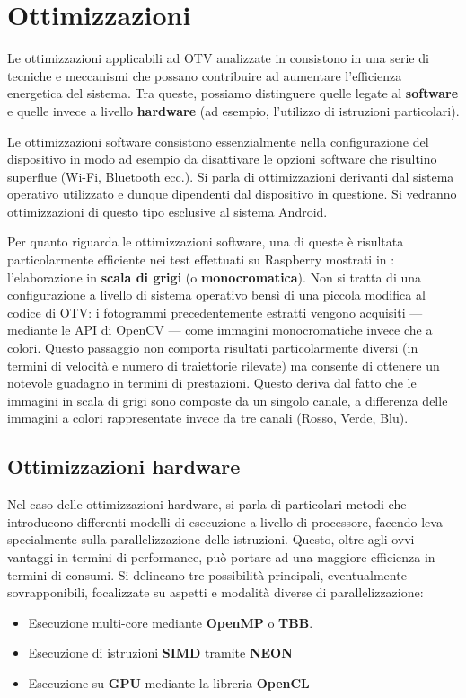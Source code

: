 \section{Ottimizzazioni}
\label{sec:ottim}

Le ottimizzazioni applicabili ad OTV analizzate in \cite{rs12122047} consistono in una serie di tecniche e meccanismi che
possano contribuire ad aumentare l'efficienza energetica del sistema. %
Tra queste, possiamo distinguere quelle legate al \textbf{software} e quelle invece a livello \textbf{hardware} 
(ad esempio, l'utilizzo di istruzioni particolari).

Le ottimizzazioni software consistono essenzialmente nella configurazione del dispositivo in modo ad esempio
da disattivare le opzioni software che risultino superflue (Wi-Fi, Bluetooth ecc.). Si parla di ottimizzazioni derivanti dal
sistema operativo utilizzato e dunque dipendenti dal dispositivo in questione. Si vedranno ottimizzazioni di questo tipo
esclusive al sistema Android.

Per quanto riguarda le ottimizzazioni software, una di queste è risultata particolarmente efficiente nei test effettuati
su Raspberry mostrati in \cite{app11157027}: l'elaborazione in \textbf{scala di grigi} (o \textbf{monocromatica}). 
Non si tratta di una configurazione a livello di sistema operativo bensì di una piccola modifica al codice di OTV: 
i fotogrammi precedentemente estratti vengono acquisiti --- mediante le API di OpenCV --- come immagini monocromatiche invece 
che a colori. Questo passaggio non comporta  risultati particolarmente diversi (in termini di velocità e numero di 
traiettorie rilevate) ma consente di ottenere un notevole guadagno in termini di prestazioni. Questo deriva dal fatto che le 
immagini in scala di grigi sono composte da un singolo canale, a differenza delle immagini a colori rappresentate invece da 
tre canali (Rosso, Verde, Blu).

\subsection{Ottimizzazioni hardware}

Nel caso delle ottimizzazioni hardware, si parla di particolari metodi che introducono differenti modelli di esecuzione
a livello di processore, facendo leva specialmente sulla parallelizzazione delle istruzioni. Questo, oltre agli ovvi vantaggi
in termini di performance, può portare ad una maggiore efficienza in termini di consumi.
Si delineano tre possibilità principali, eventualmente sovrapponibili, focalizzate su aspetti e modalità diverse di 
parallelizzazione:
\begin{itemize}
    \item Esecuzione multi-core mediante \textbf{OpenMP} o \textbf{TBB}. 
    \item Esecuzione di istruzioni \textbf{SIMD} tramite \textbf{NEON}
    \item Esecuzione su \textbf{GPU} mediante la libreria \textbf{OpenCL}
\end{itemize}


